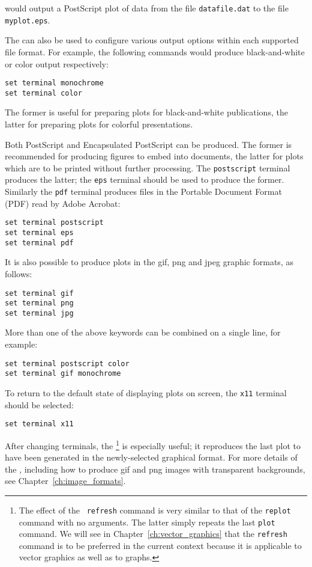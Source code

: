 \noindent would output a PostScript plot of data from the file {\tt datafile.dat} to the file
{\tt myplot.eps}.

The  can also be used to configure various output options
within each supported file format.  For example, the following commands would
produce black-and-white or color output respectively:

\begin{verbatim}
set terminal monochrome
set terminal color
\end{verbatim}

\noindent The former is useful for preparing plots for black-and-white
publications, the latter for preparing plots for colorful presentations.

Both PostScript and Encapsulated PostScript can be produced. The former is
recommended for producing figures to embed into documents, the latter for plots
which are to be printed without further processing. The {\tt postscript}
terminal produces the latter; the {\tt eps} terminal should be used to produce
the former.  Similarly the {\tt pdf} terminal produces files in the Portable
Document Format (PDF) read by Adobe Acrobat:

\begin{verbatim}
set terminal postscript
set terminal eps
set terminal pdf
\end{verbatim}

It is also possible to produce plots in the gif, png and jpeg graphic formats,
as follows:

\begin{verbatim}
set terminal gif
set terminal png
set terminal jpg
\end{verbatim}

More than one of the above keywords can be combined on a single line, for
example:

\begin{verbatim}
set terminal postscript color
set terminal gif monochrome
\end{verbatim}

To return to the default state of displaying plots on screen, the {\tt x11}
terminal should be selected:

\begin{verbatim}
set terminal x11
\end{verbatim}

After changing terminals, the \footnote{The effect of the {\tt
refresh} command is very similar to that of the {\tt replot} command with no
arguments. The latter simply repeats the last {\tt plot} command. We will see
in Chapter~\ref{ch:vector_graphics} that the {\tt refresh} command is to be
preferred in the current context because it is applicable to vector graphics as
well as to graphs.} is especially useful; it reproduces the last plot to have
been generated in the newly-selected graphical format.  For more details of the
, including how to produce gif and png images with
transparent backgrounds, see Chapter~\ref{ch:image_formats}.

